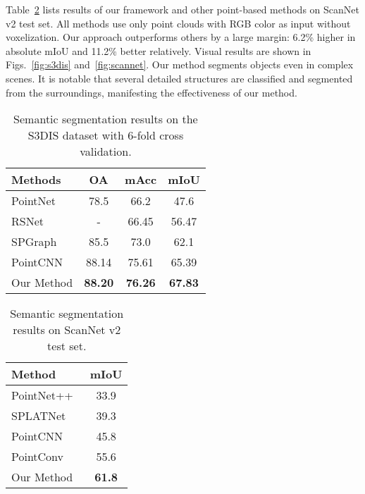 \documentclass[10pt,twocolumn,letterpaper]{article}
\begin{document}
Table~\ref{tab_scannetv2} lists results of our framework and other point-based methods on ScanNet v2 test set.
All methods use only point clouds with RGB color as input without voxelization.
Our approach outperforms others by a large margin: 6.2\% higher in absolute mIoU and 11.2\% better relatively. Visual results are shown in Figs.~\ref{fig:s3dis} and~\ref{fig:scannet}.
Our method segments objects even in complex scenes.
It is notable that several detailed structures are classified and segmented from the surroundings, manifesting the effectiveness of our method.

\begin{table}[t]
	\small
	\setlength{\tabcolsep}{5pt}
	\begin{center}
		\begin{tabular}{ l | c c c}
\toprule[1.0pt]
			Methods & OA & mAcc & mIoU\\
			\hline
			PointNet~\cite{pointnet} & 78.5 & 66.2 & 47.6\\
			RSNet~\cite{huang2018recurrent} & - & 66.45 & 56.47\\
			SPGraph~\cite{spg} & 85.5 & 73.0 & 62.1\\
			PointCNN~\cite{pointcnn} & 88.14 & 75.61 & 65.39\\
			\hline
			Our Method & \textbf{88.20} & \textbf{76.26} & \textbf{67.83}\\
\bottomrule[1.0pt]
		\end{tabular}
	\end{center}
	\vspace*{-1mm}
	\caption{Semantic segmentation results on the S3DIS dataset with 6-fold cross validation.}
	\label{tab:s3disresult2}
	\vspace*{-2mm}
\end{table}

\begin{table}
	\setlength{\tabcolsep}{8pt}
	\begin{center}
		\begin{tabular}{ l | c }
\toprule[1.0pt]
			Method & mIoU  \\
			\hline
			PointNet++~\cite{pointnet2} & 33.9 \\
			SPLATNet~\cite{splatnet} & 39.3  \\
			PointCNN~\cite{pointcnn} & 45.8 \\
			PointConv~\cite{pointconv} & 55.6  \\
			\hline
			Our Method & \textbf{61.8} \\
\bottomrule[1.0pt]
		\end{tabular}
	\end{center}
	\vspace{-1mm}
	\caption{Semantic segmentation results on ScanNet v2 test set.}
	\vspace{-2mm}
	\label{tab_scannetv2}
\end{table}
\end{document}
